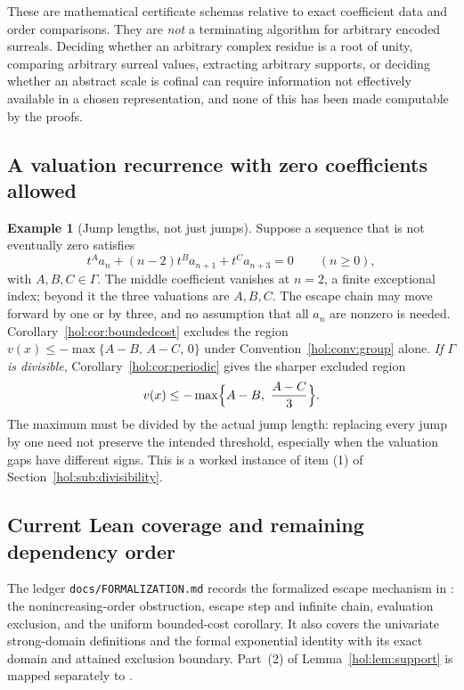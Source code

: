 \documentclass[11pt]{article}
\numberwithin{equation}{section}
\theoremstyle{definition}
\newtheorem{example}[theorem]{Example}
\theoremstyle{remark}
\begin{document}
These are mathematical certificate schemas relative to exact coefficient data
and order comparisons. They are \emph{not} a terminating algorithm for
arbitrary encoded surreals. Deciding whether an arbitrary complex residue is a
root of unity, comparing arbitrary surreal values, extracting arbitrary
supports, or deciding whether an abstract scale is cofinal can require
information not effectively available in a chosen representation, and none of
this has been made computable by the proofs.

\subsection{A valuation recurrence with zero coefficients allowed}

\begin{example}[Jump lengths, not just jumps]\label{hol:ex:sparse}
Suppose a sequence that is not eventually zero satisfies
\[
 t^Aa_n+(n-2)t^Ba_{n+1}+t^Ca_{n+3}=0\qquad(n\ge0),
\]
with $A,B,C\in\Gamma$. The middle coefficient vanishes at $n=2$, a finite
exceptional index; beyond it the three valuations are $A,B,C$. The escape
chain may move forward by one or by three, and no assumption that all $a_n$
are nonzero is needed. Corollary~\ref{hol:cor:boundedcost} excludes the region
$v(x)\le-\max\{A-B,\,A-C,\,0\}$ under
Convention~\ref{hol:conv:group} alone. \emph{If $\Gamma$ is divisible},
Corollary~\ref{hol:cor:periodic} gives the sharper excluded region
\[
 v(x)\le-\max\Bigl\{A-B,\ \frac{A-C}{3}\Bigr\}.
\]
The maximum must be divided by the actual jump length: replacing every jump by
one need not preserve the intended threshold, especially when the valuation
gaps have different signs. This is a worked instance of item (1) of
Section~\ref{hol:sub:divisibility}.
\end{example}

\subsection{Current Lean coverage and remaining dependency order}

The ledger \texttt{docs/FORMALIZATION.md} records the formalized escape
mechanism in :
the nonincreasing-order obstruction, escape step and infinite chain,
evaluation exclusion, and the uniform bounded-cost corollary. It also covers
the univariate strong-domain definitions and the formal exponential
identity with its exact domain and attained exclusion boundary.
Part~(2) of Lemma~\ref{hol:lem:support} is mapped separately to
.
\end{document}
